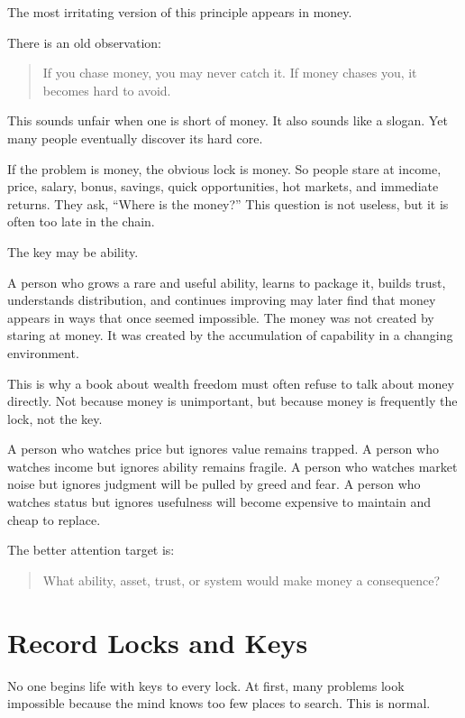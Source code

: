The most irritating version of this principle appears in money.

There is an old observation:

\begin{quote}
If you chase money, you may never catch it. If money chases you, it becomes hard to avoid.
\end{quote}

This sounds unfair when one is short of money. It also sounds like a slogan. Yet many people eventually discover its hard core.

If the problem is money, the obvious lock is money. So people stare at income, price, salary, bonus, savings, quick opportunities, hot markets, and immediate returns. They ask, ``Where is the money?'' This question is not useless, but it is often too late in the chain.

The key may be ability.

A person who grows a rare and useful ability, learns to package it, builds trust, understands distribution, and continues improving may later find that money appears in ways that once seemed impossible. The money was not created by staring at money. It was created by the accumulation of capability in a changing environment.

This is why a book about wealth freedom must often refuse to talk about money directly. Not because money is unimportant, but because money is frequently the lock, not the key.

A person who watches price but ignores value remains trapped. A person who watches income but ignores ability remains fragile. A person who watches market noise but ignores judgment will be pulled by greed and fear. A person who watches status but ignores usefulness will become expensive to maintain and cheap to replace.

The better attention target is:

\begin{quote}
What ability, asset, trust, or system would make money a consequence?
\end{quote}

\section*{Record Locks and Keys}

No one begins life with keys to every lock. At first, many problems look impossible because the mind knows too few places to search. This is normal.

